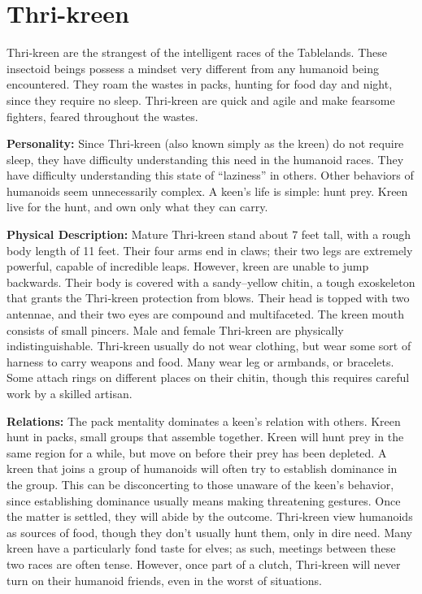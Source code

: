 \documentclass[10pt,a4paper,twocolumn]{d20}
\begin{document}
{\section{Thri-kreen}

Thri‐kreen are the strangest of the intelligent races of the Tablelands. These insectoid beings possess a mindset very different from any humanoid being encountered. They roam the wastes in packs, hunting for food day and night, since they require no sleep. Thri‐kreen are quick and agile and make fearsome fighters, feared throughout the wastes.

\textbf{Personality:} Since Thri‐kreen (also known simply as the kreen) do not require sleep, they have difficulty understanding this need in the humanoid races. They have difficulty understanding this state of ``laziness'' in others. Other behaviors of humanoids seem unnecessarily complex. A keen’s life is simple: hunt prey. Kreen live for the hunt, and own only what they can carry.

\textbf{Physical Description:} Mature Thri‐kreen stand about 7 feet tall, with a rough body length of 11 feet. Their four arms end in claws; their two legs are extremely powerful, capable of incredible leaps. However, kreen are unable to jump backwards. Their body is covered with a sandy–yellow chitin, a tough exoskeleton that grants the Thri‐kreen protection from blows. Their head is topped with two antennae, and their two eyes are compound and multifaceted. The kreen mouth consists of small pincers. Male and female Thri‐kreen are physically indistinguishable. Thri‐kreen usually do not wear clothing, but wear some sort of harness to carry weapons and food. Many wear leg or armbands, or bracelets. Some attach rings on different places on their chitin, though this requires careful work by a skilled artisan.

\textbf{Relations:} The pack mentality dominates a keen’s relation with others. Kreen hunt in packs, small groups that assemble together. Kreen will hunt prey in the same region for a while, but move on before their prey has been depleted. A kreen that joins a group of humanoids will often try to establish dominance in the group. This can be disconcerting to those unaware of the keen’s behavior, since establishing dominance usually means making threatening gestures. Once the matter is settled, they will abide by the outcome. Thri‐kreen view humanoids as sources of food, though they don’t usually hunt them, only in dire need. Many kreen have a particularly fond taste for elves; as such, meetings between these two races are often tense. However, once part of a clutch, Thri‐kreen will never turn on their humanoid friends, even in the worst of situations.

}
\end{document}
